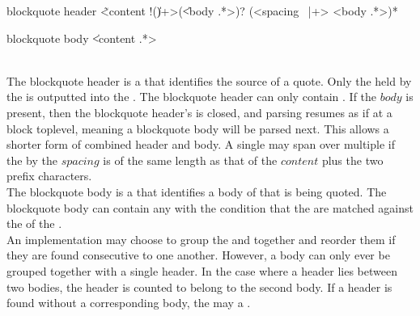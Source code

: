 \begin{identifier}{blockquote header}
\~ <content !(\| )+>(\| <body .*>)?
(<spacing ~|+> <body .*>)*
\end{identifier}
\begin{identifier}{blockquote body}
\| <content .*>
\end{identifier}
 \\

The blockquote header is a  that identifies the source of a quote. Only the  held by the  is outputted into the . The blockquote header  can only contain . If the \inline$body$  is present, then the blockquote header's  is closed, and parsing resumes as if at a block toplevel, meaning a blockquote body will be parsed next. This allows a shorter form of combined header and body. A single  may span over multiple  if the   by the \inline$spacing$  is of the same length as that of the \inline$content$  plus the two prefix characters. \\

The blockquote body is a  that identifies a body of  that is being quoted. The blockquote body can contain any  with the condition that the  are matched against the  of the . \\

An implementation may choose to group the  and  together and reorder them if they are found consecutive to one another. However, a body can only ever be grouped together with a single header. In the case where a header lies between two bodies, the header is counted to belong to the second body. If a header is found without a corresponding body, the  may  a . \\

